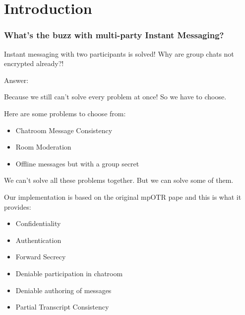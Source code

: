\section{Introduction}

\newcommand{\mandragore}{\textcolor{blue}{mandragore}}
\newcommand{\vulpecula}{\textcolor{green}{vulpecula}}
\newcommand{\noscope}{\textcolor{red}{noscope}}

\begin{frame}
  \frametitle{What's the buzz with multi-party Instant Messaging?}
  \centering
  Instant messaging with two participants is solved!
  Why are group chats not encrypted already?!\\[0.3cm]
\end{frame}

\begin{frame}
  \centering
  Answer:

  Because we still can't solve every problem at once! So we have to choose.
\end{frame}

\begin{frame}

  Here are some problems to choose from:

  \begin{itemize}
    \item Chatroom Message Consistency
    \item Room Moderation
    \item Offline messages but with a group secret
  \end{itemize}

  \vfill

  We can't solve all these problems together. But we can solve some of them.

\end{frame}

\begin{frame}
  Our implementation is based on the original mpOTR pape and this is what it provides:

  \begin{itemize}
    \item Confidentiality
    \item Authentication
    \item Forward Secrecy
    \item Deniable participation in chatroom
    \item Deniable authoring of messages
    \item Partial Transcript Consistency
  \end{itemize}

\end{frame}

